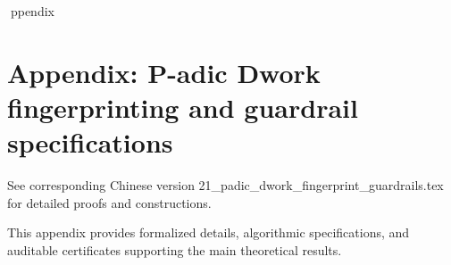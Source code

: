 ppendix

\section*{Appendix: P-adic Dwork fingerprinting and guardrail specifications}

See corresponding Chinese version 21_padic_dwork_fingerprint_guardrails.tex for detailed proofs and constructions.

This appendix provides formalized details, algorithmic specifications, and auditable certificates supporting the main theoretical results.
